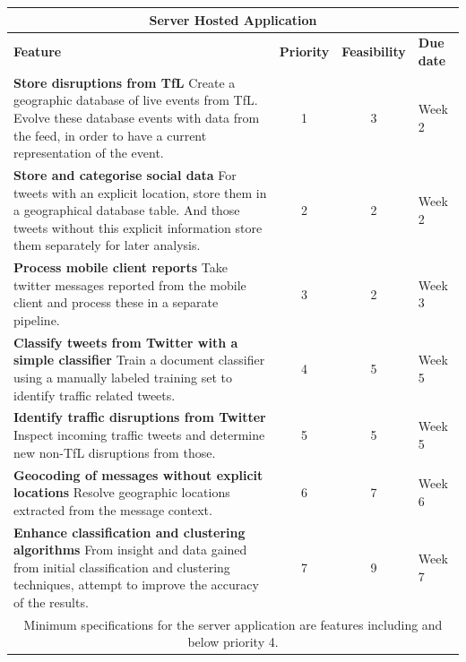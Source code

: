 \begin{center}
\begin{tabular}{ | p{9cm} | c | c | p{1.8cm} | }
\hline
\multicolumn{4}{|c|}{\textbf{Server Hosted Application}} \\ \hline
\textbf{Feature} & \textbf{Priority} & \textbf{Feasibility} & \textbf{Due date} \\ \hline
\textbf{Store disruptions from TfL} \newline
Create a geographic database of live events from TfL. Evolve these database events with data from the feed, in order to have a current representation of the event. & 1 & 3 & Week 2 \\ \hline
\textbf{Store and categorise social data} \newline
For tweets with an explicit location, store them in a geographical database
table. And those tweets without this explicit information store them separately for later
analysis. & 2 & 2 & Week 2 \\ \hline
\textbf{Process mobile client reports} \newline
Take twitter messages reported from the mobile client and process these in a
separate pipeline. & 3 & 2 & Week 3 \\ \hline
\textbf{Classify tweets from Twitter with a simple classifier} \newline
Train a document classifier using a manually labeled training set to 
identify traffic related tweets. & 4 & 5 & Week 5 \\ \hline
\textbf{Identify traffic disruptions from Twitter} \newline
Inspect incoming traffic tweets and determine new non-TfL disruptions from
those. & 5 & 5 & Week 5 \\ \hline
\textbf{Geocoding of messages without explicit locations} \newline
Resolve geographic locations extracted from the message context. & 6 & 7 & Week 6 \\ \hline
\textbf{Enhance classification and clustering algorithms} \newline
From insight and data gained from initial classification and clustering
techniques, attempt to improve the accuracy of the results. & 7 & 9 & Week 7 \\ \hline
\multicolumn{4}{|c|}{Minimum specifications for the server application are
features including and below priority 4.} \\ \hline
\end{tabular}
\end{center}
